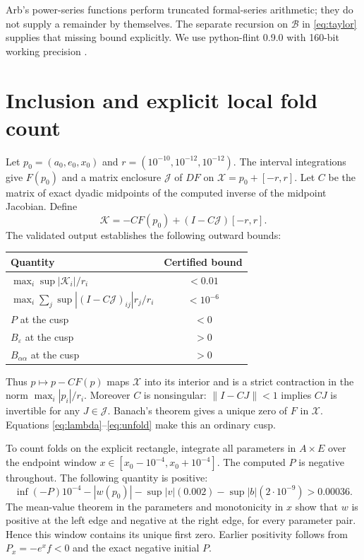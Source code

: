 \documentclass[11pt,a4paper]{report}
\begin{document}
Arb's power-series functions perform truncated formal-series arithmetic;
they do not supply a remainder by themselves. The separate recursion on
$\mathcal B$ in \eqref{eq:taylor} supplies that missing bound explicitly.
We use python-flint 0.9.0 with 160-bit working precision
\autocite{Johansson2017}.

\section{Inclusion and explicit local fold count}
Let $p_0=(a_0,e_0,x_0)$ and $r=(10^{-10},10^{-12},10^{-12})$.
The interval integrations give $F(p_0)$ and a matrix enclosure $\mathcal J$
of $DF$ on $\mathcal X=p_0+[-r,r]$. Let $C$ be the matrix of exact dyadic
midpoints of the computed inverse of the midpoint Jacobian. Define
\[
 \mathcal K=-CF(p_0)+(I-C\mathcal J)[-r,r].
\]
The validated output establishes the following outward bounds:
\begin{center}
\begin{tabular}{lc}
Quantity & Certified bound\\\hline
$\max_i\sup|\mathcal K_i|/r_i$ & $<0.01$\\
$\max_i\sum_j\sup|(I-C\mathcal J)_{ij}|r_j/r_i$ & $<10^{-6}$\\
$P$ at the cusp & $<0$\\
$B_\varepsilon$ at the cusp & $>0$\\
$B_{\alpha\alpha}$ at the cusp & $>0$
\end{tabular}
\end{center}
Thus $p\mapsto p-CF(p)$ maps $\mathcal X$ into its interior and is a strict
contraction in the norm $\max_i|p_i|/r_i$. Moreover $C$ is nonsingular:
$\|I-CJ\|<1$ implies $CJ$ is invertible for any $J\in\mathcal J$.
Banach's theorem gives a unique zero of $F$ in $\mathcal X$.
Equations \eqref{eq:lambda}--\eqref{eq:unfold} make this an ordinary cusp.

To count folds on the explicit rectangle, integrate all parameters in
$A\times E$ over the endpoint window $x\in[x_0-10^{-4},x_0+10^{-4}]$.
The computed $P$ is negative throughout. The following quantity is positive:
\begin{equation}\label{eq:eventmargin}
 \inf(-P)10^{-4}-|w(p_0)|
       -\sup|v|(0.002)-\sup|b|(2\cdot10^{-9})>0.00036.
\end{equation}
The mean-value theorem in the parameters and monotonicity in $x$ show that
$w$ is positive at the left edge and negative at the right edge, for every
parameter pair. Hence this window contains its unique first zero. Earlier
positivity follows from $P_x=-e^xf<0$ and the exact negative initial $P$.
\end{document}
